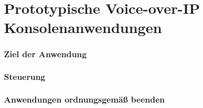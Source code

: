 \chapter{Prototypische Voice-over-IP Konsolenanwendungen}
\label{prototypProgram}
\subsection{Ziel der Anwendung}
\subsection{Steuerung}
\subsection{Anwendungen ordnungsgemäß beenden}
